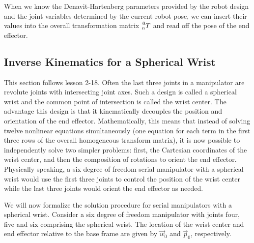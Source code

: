 \documentclass[11pt, onecolumn, oneside, reqno]{article}
\begin{document}
When we know the Denavit-Hartenberg parameters provided by the robot design and the joint variables determined by the current robot pose, we can insert their values into the overall transformation matrix $\prescript{0}{n} T$ and read off the pose of the end effector.

\subsection{Inverse Kinematics for a Spherical Wrist}
This section follows lesson 2-18. Often the last three joints in a manipulator are revolute joints with intersecting joint axes. Such a design is called a spherical wrist and the common point of intersection is called the wrist center. The advantage this design is that it kinematically decouples the position and orientation of the end effector. Mathematically, this means that instead of solving twelve nonlinear equations simultaneously (one equation for each term in the first three rows of the overall homogeneous transform matrix), it is now possible to independently solve two simpler problems: first, the Cartesian coordinates of the wrist center, and then the composition of rotations to orient the end effector. Physically speaking, a six degree of freedom serial manipulator with a spherical wrist would use the first three joints to control the position of the wrist center while the last three joints would orient the end effector as needed.

We will now formalize the solution procedure for serial manipulators with a spherical wrist. Consider a six degree of freedom manipulator with joints four, five and six comprising the spherical wrist. The location of the wrist center and end effector relative to the base frame are given by $\vec{w}_0$ and $\vec{p}_0$, respectively.
\end{document}
